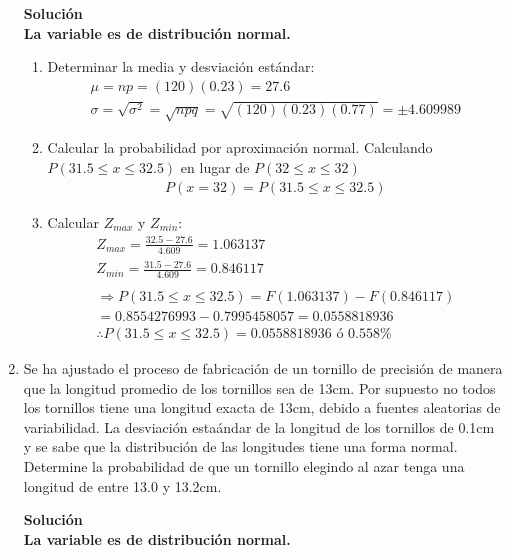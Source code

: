 \begin{enumerate}
	\textbf{Solución}\\
	\textbf{La variable es de distribución normal.}
    \begin{enumerate}
        \item Determinar la media y desviación estándar:
        \begin{gather*}
			\mu =np=(120)(0.23)=27.6\\
			\sigma=\sqrt{\sigma^{2}}	= \sqrt{npq}=\sqrt{(120)(0.23)(0.77)} = \pm 4.609989
		\end{gather*}
    	\item Calcular la probabilidad por aproximación normal. Calculando $P(31.5\leq x\leq32.5)$ en lugar de $P(32\leq x\leq32)$\\
    	\begin{gather*}
    		P(x=32)= P(31.5\leq x\leq32.5)
    	\end{gather*}
    	\item Calcular $Z_{max}$ y $Z_{min}$:
    	\begin{gather*}
    		Z_{max}=\frac{32.5-27.6}{4.609}=1.063137\\
    		Z_{min}=\frac{31.5-27.6}{4.609}=0.846117\\\\
    		\Rightarrow  P(31.5\leq x\leq32.5) = F(1.063137)-F(0.846117)\\
    		= 0.8554276993-0.7995458057=0.0558818936\\
    		\therefore P(31.5\leq x\leq32.5) = 0.0558818936 \text{ ó } 0.558\%
    	\end{gather*}
    \end{enumerate}


	\item Se ha ajustado el proceso de fabricación de un tornillo de precisión de manera que la longitud promedio de los tornillos sea de 13cm. Por supuesto no todos los tornillos tiene una longitud exacta de 13cm, debido a fuentes aleatorias de variabilidad. La desviación estaándar de la longitud de los tornillos de 0.1cm y se sabe que la distribución de las longitudes tiene una forma normal. Determine la probabilidad de que un tornillo elegindo al azar tenga una longitud de entre 13.0 y 13.2cm.

	\textbf{Solución}\\
	\textbf{La variable es de distribución normal.}
    \begin{enumerate}


\end{enumerate}
\end{enumerate}
